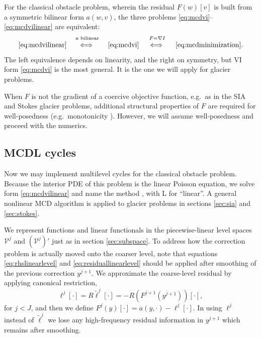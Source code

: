 \documentclass[letterpaper,final,12pt,reqno]{amsart}
\theoremstyle{claim}
\newcommand{\grad}{\nabla}
\numberwithin{equation}{section}
\numberwithin{figure}{section}
\numberwithin{table}{section}
\numberwithin{theorem}{section}
\begin{document}
For the classical obstacle problem, wherein the residual $F(w)[v]$ is built from a symmetric bilinear form $a(w,v)$, the three problems \eqref{eq:mcdvi}--\eqref{eq:mcdvilinear} are equivalent:
   $$\eqref{eq:mcdvilinear} \quad \stackrel{a \text{ bilinear}}{\iff\strut} \quad \eqref{eq:mcdvi} \quad \stackrel{F=\grad I}{\iff\strut} \quad \eqref{eq:mcdminimization}.$$
The left equivalence depends on linearity, and the right on symmetry, but VI form \eqref{eq:mcdvi} is the most general.  It is the one we will apply for glacier problems.

When $F$ is not the gradient of a coercive objective function, e.g.~as in the SIA and Stokes glacier problems, additional structural properties of $F$ are required for well-posedness (e.g.~monotonicity \cite{Bueler2020,JouvetBueler2012,KinderlehrerStampacchia1980}).  However, we will assume well-posedness and proceed with the numerics.

\subsection*{MCDL cycles}  Now we may implement multilevel cycles for the classical obstacle problem.  Because the interior PDE of this problem is the linear Poisson equation, we solve form \eqref{eq:mcdvilinear} and name the method , with L for ``linear''.  A general nonlinear MCD algorithm is applied to glacier problems in sections \ref{sec:sia} and \ref{sec:stokes}.

We represent functions and linear functionals in the piecewise-linear level spaces $\mathcal{V}^j$ and $(\mathcal{V}^j)'$ just as in section \ref{sec:subspace}.  To address how the correction problem is actually moved onto the coarser level, note that equations \eqref{eq:rhslinearlevel} and \eqref{eq:residuallinearlevel} should be applied after smoothing of the previous correction $y^{j+1}$.  We approximate the coarse-level residual by applying canonical restriction,
\begin{equation}
\ell^j[\cdot] = R \tilde\ell^j[\cdot] = - R(F^{j+1}(y^{j+1}))[\cdot], \label{eq:restrictedrhslinearlevel}
\end{equation}
for $j<J$, and then we define $F^j(y)[\cdot] = a(y,\cdot) - \ell^j[\cdot]$.  In using $\ell^j$ instead of $\tilde\ell^j$ we lose any high-frequency residual information in $y^{j+1}$ which remains after smoothing.
\end{document}
